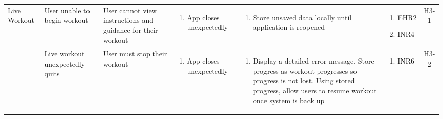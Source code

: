 \documentclass{article}
\begin{document}
\begin{longtable}{|p{1.7cm}|p{1.7cm} p{2.4cm} p{2.4cm} p{3.5cm} p{1.6cm} c|}
  \hline
  Live Workout & User unable to begin workout & User cannot view instructions and guidance for their workout & \vspace*{-\baselineskip}\begin{enumerate}[label=\alph*., left=0pt, nosep]\item App closes unexpectedly \end{enumerate} & \vspace*{-\baselineskip}\begin{enumerate}[label=\alph*., left=0pt, nosep]\item Store unsaved data locally until application is reopened \end{enumerate}& \vspace*{-\baselineskip}\begin{enumerate}[label=\alph*., left=0pt, nosep] \item EHR2 \item INR4 \end{enumerate} & H3-1\\
  \cline{2-7}
  & Live workout unexpectedly quits & User must stop their workout & \vspace*{-\baselineskip}\begin{enumerate}[label=\alph*., left=0pt, nosep]\item App closes unexpectedly \end{enumerate} & \vspace*{-\baselineskip}\begin{enumerate}[label=\alph*., left=0pt, nosep]\item Display a detailed error message. Store progress as workout progresses so progress is not lost. Using stored progress, allow users to resume workout once system is back up \end{enumerate} & \vspace*{-\baselineskip}\begin{enumerate}[label=\alph*., left=0pt, nosep] \item INR6 \end{enumerate} & H3-2\\
  \hline

\end{longtable}
\end{document}
